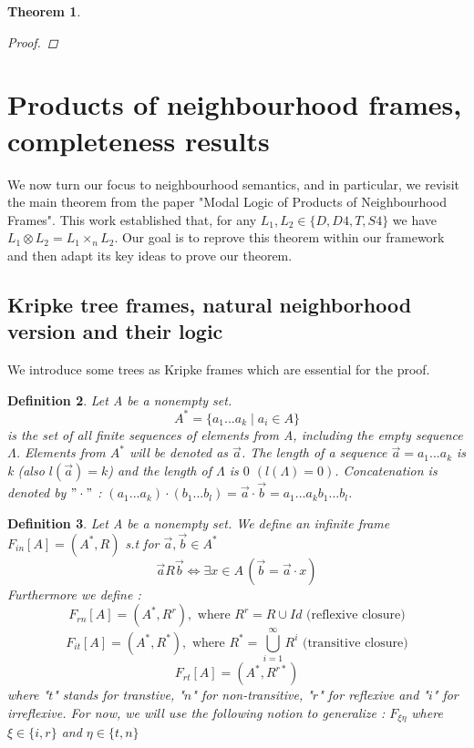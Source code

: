 \documentclass[12pt, a4paper]{scrartcl}
\newtheorem{definition}{Definition}[subsection]
\newtheorem{theorem}[definition]{Theorem}
\begin{document}
\begin{theorem}
\begin{proof}
    

    \end{proof}

\end{theorem}


\section{Products of neighbourhood frames, completeness results}
We now turn our focus to neighbourhood semantics, and in particular, we revisit the main theorem from the paper "Modal Logic of Products of Neighbourhood Frames". This work established that, for any $L_1, L_2 \in \{D,D4,T,S4\}$ we have
$L_1 \otimes L_2 = L_1 \times_n L_2$.
Our goal is to reprove this theorem within our framework and then adapt its key ideas to prove our theorem.

\subsection{Kripke tree frames, natural neighborhood version and their logic}
We introduce some trees as Kripke frames which are essential for the proof.

\begin{definition}
    Let A be a nonempty set.
    $$A^* = \{a_1...a_k \mid a_i \in A\}$$ 
    is the set of all finite sequences of elements from A, including the empty sequence $\Lambda$.
    Elements from $A^*$ will be denoted as $\vec{a}$. The length of a sequence $\vec{a} = a_1...a_k$ is k (also $l(\vec{a}) = k$) 
    and the length of $\Lambda$ is $0$ $(l(\Lambda) = 0)$. Concatenation is denoted by $"\cdot"$ : $(a_1...a_k) \cdot (b_1...b_l) = \vec{a} \cdot \vec{b} = a_1...a_kb_1...b_l$.

\end{definition}

\begin{definition}
    Let A be a nonempty set. We define an infinite frame $F_{in}[A] = (A^*, R)$ s.t for $\vec{a}, \vec{b} \in A^*$ 
    $$\vec{a}R\vec{b} \Leftrightarrow \exists x \in A \, (\vec{b} = \vec{a} \cdot x)$$
    Furthermore we define : 
    $$F_{rn}[A] = (A^*,R^r), \mbox{ where } R^r = R \cup Id \mbox{ (reflexive closure)}$$
    $$F_{it}[A] = (A^*,R^*), \mbox{ where } R^* = \bigcup_{i=1}^{\infty}R^i \mbox{ (transitive closure)}$$
    $$F_{rt}[A] = (A^*, R^{r*})$$ \newline
    where "$t$" stands for transtive, "$n$" for non-transitive, "$r$" for reflexive and "$i$" for irreflexive. \newline
    For now, we will use the following notion to generalize : $F_{\xi \eta}$ where $\xi \in \{i,r\}$ and $\eta \in \{t,n\}$ \newline
\end{definition}
\end{document}
